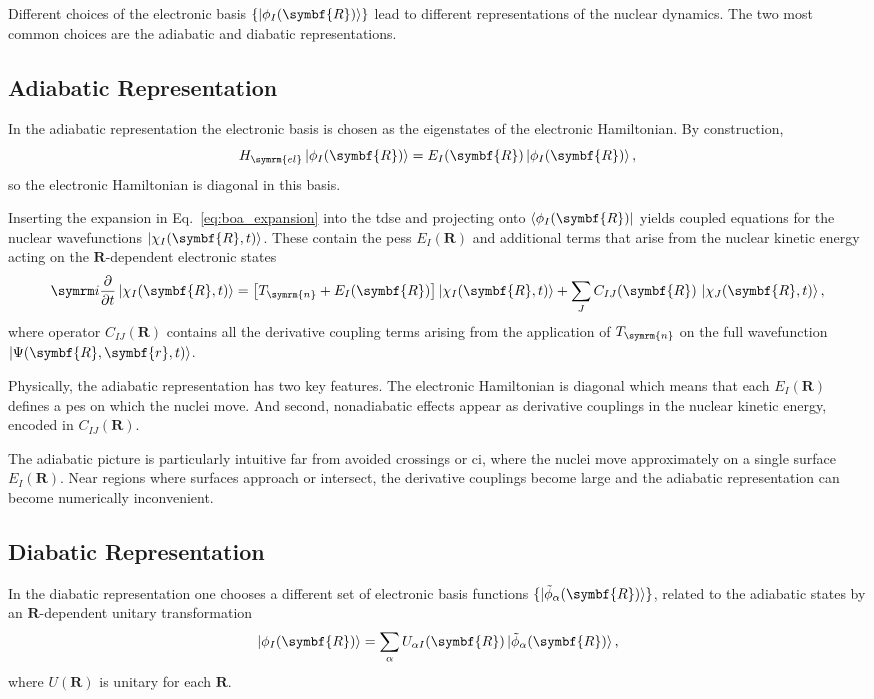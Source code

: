 Different choices of the electronic basis $\{\ket{\phi_I(\symbf{R})}\}$ lead to different representations of the nuclear dynamics. The two most common choices are the adiabatic and diabatic representations.
\subsection{Adiabatic Representation}\label{sec:adiabatic_representation}
In the adiabatic representation the electronic basis is chosen as the eigenstates of the electronic Hamiltonian. By construction,
\begin{equation}
H_{\symrm{el}}\ket{\phi_I(\symbf{R})}=E_I(\symbf{R})\ket{\phi_I(\symbf{R})},
\end{equation}
so the electronic Hamiltonian is diagonal in this basis.

Inserting the expansion in Eq.~\eqref{eq:boa_expansion} into the \gls{tdse} and projecting onto $\bra{\phi_I(\symbf{R})}$ yields coupled equations for the nuclear wavefunctions $\ket{\chi_I(\symbf{R},t)}$. These contain the \glspl{pes} $E_I(\symbf{R})$ and additional terms that arise from the nuclear kinetic energy acting on the $\symbf{R}$-dependent electronic states
\begin{equation}
\i\frac{\partial}{\partial{t}}\ket{\chi_I(\symbf{R},t)}=\left[T_{\symrm{n}}+E_I(\symbf{R})\right]\ket{\chi_I(\symbf{R},t)}+\sum_JC_{IJ}(\symbf{R})\,\ket{\chi_J(\symbf{R},t)},
\end{equation}
where operator $C_{IJ}(\symbf{R})$ contains all the derivative coupling terms arising from the application of $T_{\symrm{n}}$ on the full wavefunction $\ket{\Psi(\symbf{R},\symbf{r},t)}$.

Physically, the adiabatic representation has two key features. The electronic Hamiltonian is diagonal which means that each $E_I(\symbf{R})$ defines a \gls{pes} on which the nuclei move. And second, nonadiabatic effects appear as derivative couplings in the nuclear kinetic energy, encoded in $C_{IJ}(\symbf{R})$.

The adiabatic picture is particularly intuitive far from avoided crossings or \gls{ci}, where the nuclei move approximately on a single surface $E_I(\symbf{R})$. Near regions where surfaces approach or intersect, the derivative couplings become large and the adiabatic representation can become numerically inconvenient.
\subsection{Diabatic Representation}\label{sec:diabatic_representation}
In the diabatic representation one chooses a different set of electronic basis functions $\{\ket{\tilde\phi_\alpha(\symbf{R})}\}$, related to the adiabatic states by an $\symbf{R}$-dependent unitary transformation
\begin{equation}\label{eq:unitary_transform}
\ket{\phi_I(\symbf{R})}=\sum_\alpha U_{\alpha I}(\symbf{R})\ket{\tilde\phi_\alpha(\symbf{R})},
\end{equation}
where $U(\symbf{R})$ is unitary for each $\symbf{R}$.

